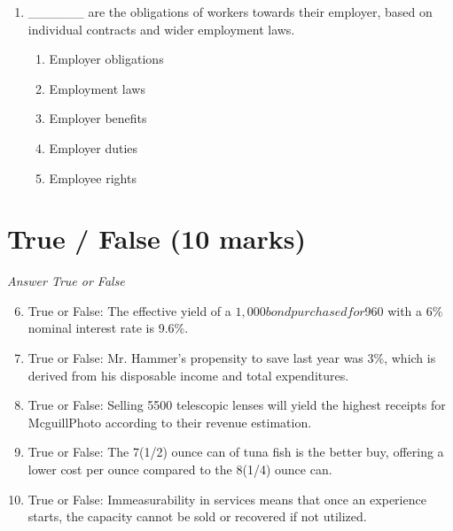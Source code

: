 \documentclass[12pt]{article}
\begin{document}
\begin{enumerate}[label=\arabic*.]
\begin{enumerate}[label=(\alph*)]
    \item \$35,000
    \item \$55,000
    \item \$45,225
    \item \$40,000
    \item \$65,000
\end{enumerate}
\item \_\_\_\_\_\_ are the obligations of workers towards their employer, based on individual contracts and wider employment laws.
\begin{enumerate}[label=(\alph*)]
    \item Employer obligations
    \item Employment laws
    \item Employer benefits
    \item Employer duties
    \item Employee rights
\end{enumerate}
\end{enumerate}

\section*{True / False (10 marks)}
\textit{Answer True or False}
\begin{enumerate}[label=\arabic*.]
\setcounter{enumi}{5}
\item True or False: The effective yield of a $1,000 bond purchased for $960 with a 6\% nominal interest rate is 9.6\%.
\item True or False: Mr. Hammer's propensity to save last year was 3\%, which is derived from his disposable income and total expenditures.
\item True or False: Selling 5500 telescopic lenses will yield the highest receipts for McguillPhoto according to their revenue estimation.
\item True or False: The 7(1/2) ounce can of tuna fish is the better buy, offering a lower cost per ounce compared to the 8(1/4) ounce can.
\item True or False: Immeasurability in services means that once an experience starts, the capacity cannot be sold or recovered if not utilized.
\end{enumerate}
\end{document}
